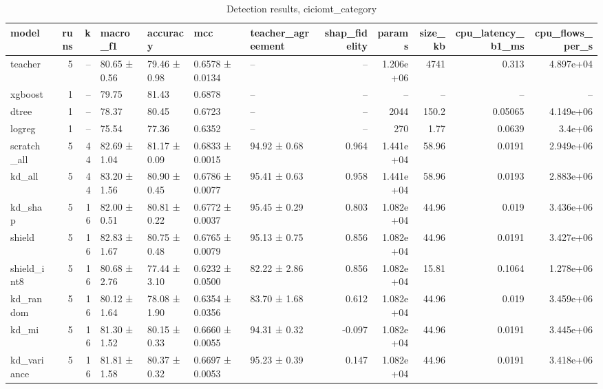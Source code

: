 \begin{table}
\caption{Detection results, ciciomt_category}
\begin{tabular}{lrrllllrrrrr}
\toprule
model & runs & k & macro_f1 & accuracy & mcc & teacher_agreement & shap_fidelity & params & size_kb & cpu_latency_b1_ms & cpu_flows_per_s \\
\midrule
teacher & 5 & -- & 80.65 ± 0.56 & 79.46 ± 0.98 & 0.6578 ± 0.0134 & -- & -- & 1.206e+06 & 4741 & 0.313 & 4.897e+04 \\
xgboost & 1 & -- & 79.75 & 81.43 & 0.6878 & -- & -- & -- & -- & -- & -- \\
dtree & 1 & -- & 78.37 & 80.45 & 0.6723 & -- & -- & 2044 & 150.2 & 0.05065 & 4.149e+06 \\
logreg & 1 & -- & 75.54 & 77.36 & 0.6352 & -- & -- & 270 & 1.77 & 0.0639 & 3.4e+06 \\
scratch_all & 5 & 44 & 82.69 ± 1.04 & 81.17 ± 0.09 & 0.6833 ± 0.0015 & 94.92 ± 0.68 & 0.964 & 1.441e+04 & 58.96 & 0.0191 & 2.949e+06 \\
kd_all & 5 & 44 & 83.20 ± 1.56 & 80.90 ± 0.45 & 0.6786 ± 0.0077 & 95.41 ± 0.63 & 0.958 & 1.441e+04 & 58.96 & 0.0193 & 2.883e+06 \\
kd_shap & 5 & 16 & 82.00 ± 0.51 & 80.81 ± 0.22 & 0.6772 ± 0.0037 & 95.45 ± 0.29 & 0.803 & 1.082e+04 & 44.96 & 0.019 & 3.436e+06 \\
shield & 5 & 16 & 82.83 ± 1.67 & 80.75 ± 0.48 & 0.6765 ± 0.0079 & 95.13 ± 0.75 & 0.856 & 1.082e+04 & 44.96 & 0.0191 & 3.427e+06 \\
shield_int8 & 5 & 16 & 80.68 ± 2.76 & 77.44 ± 3.10 & 0.6232 ± 0.0500 & 82.22 ± 2.86 & 0.856 & 1.082e+04 & 15.81 & 0.1064 & 1.278e+06 \\
kd_random & 5 & 16 & 80.12 ± 1.64 & 78.08 ± 1.90 & 0.6354 ± 0.0356 & 83.70 ± 1.68 & 0.612 & 1.082e+04 & 44.96 & 0.019 & 3.459e+06 \\
kd_mi & 5 & 16 & 81.30 ± 1.52 & 80.15 ± 0.33 & 0.6660 ± 0.0055 & 94.31 ± 0.32 & -0.097 & 1.082e+04 & 44.96 & 0.0191 & 3.445e+06 \\
kd_variance & 5 & 16 & 81.81 ± 1.58 & 80.37 ± 0.32 & 0.6697 ± 0.0053 & 95.23 ± 0.39 & 0.147 & 1.082e+04 & 44.96 & 0.0191 & 3.418e+06 \\
\bottomrule
\end{tabular}
\end{table}
